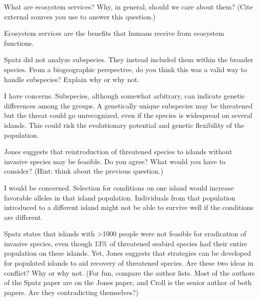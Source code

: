 \documentclass[11pt, addpoints]{exam}
\begin{document}
\begin{questions}
\question[5]
What are ecosystem services? Why, in general, should we care about them? (Cite external sources you use to answer this question.)

\begin{solution}
	Ecosystem services are the benefits that humans receive from ecosystem functions.
\end{solution}

\question[5]
Spatz did not analyze subspecies. They instead included them within the broader species. From a biogeographic perspective, do you think this was a valid way to handle subspecies? Explain why or why not.

\begin{solution}
	I have concerns. Subspecies, although somewhat arbitrary, can indicate genetic differences among the groups. A genetically unique subspecies may be threatened but the threat could go unrecognized, even if the species is widespread on several islands. This could risk the evolutionary potential and genetic flexibility of the population.
\end{solution}

\question[5] \label{ques:subspecies}
Jones suggests that reintroduction of threatened species to islands without invasive species may be feasible. Do you agree?  What would you have to consider? (Hint: think about the previous question.)

\begin{solution}
	I would be concerned. Selection for conditions on one island would increase favorable alleles in that island population. Individuals from that population introduced to a different island might not be able to survive well if the conditions are different.
\end{solution}


\question[5]
Spatz states that islands with \textgreater1000 people were not feasible for eradication of invasive species, even though 13\% of threatened seabird species had their entire population on these islands. Yet, Jones suggests that strategies can be developed for populated islands to aid recovery of threatened species. Are these two ideas in conflict?  Why or why not. (For fun, compare the author lists. Most of the authors of the Spatz paper are on the Jones paper, and Croll is the senior author of both papers. Are they contradicting themselves?)



\end{questions}
\end{document}
